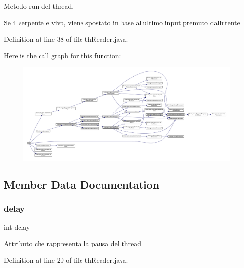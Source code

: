 Metodo run del thread. 

Se il serpente e\textquotesingle{} vivo, viene spostato in base all\textquotesingle{}ultimo input premuto dall\textquotesingle{}utente 

Definition at line 38 of file th\+Reader.\+java.

Here is the call graph for this function\+:
\nopagebreak
\begin{figure}[H]
\begin{center}
\leavevmode
\includegraphics[width=350pt]{class_snake_1_1game_1_1threads_1_1th_reader_a13a43e6d814de94978c515cb084873b1_cgraph}
\end{center}
\end{figure}


\subsection{Member Data Documentation}
\mbox{\label{class_snake_1_1game_1_1threads_1_1th_reader_a6f1be1f780ff54ec75b41451cd4d90bd}} 
\subsubsection{\texorpdfstring{delay}{delay}}
{\footnotesize\ttfamily int delay\hspace{0.3cm}{\ttfamily [private]}}

Attributo che rappresenta la pausa del thread 

Definition at line 20 of file th\+Reader.\+java.

\mbox{\label{class_snake_1_1game_1_1threads_1_1th_reader_a09bac1b4079089c0f6a6eff874a820b8}} 
